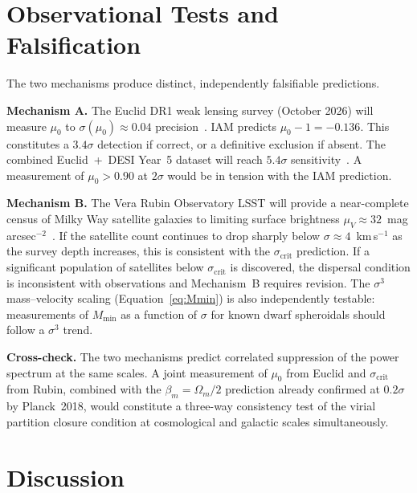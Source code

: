 \documentclass[12pt,a4paper]{article}
\begin{document}
\section{Observational Tests and Falsification}
\label{sec:tests}

The two mechanisms produce distinct, independently falsifiable predictions.

\textbf{Mechanism A.} The Euclid DR1 weak lensing survey (October 2026) will
measure $\mu_0$ to $\sigma(\mu_0) \approx 0.04$ precision~\citep{Euclid2024}.
IAM predicts $\mu_0 - 1 = -0.136$. This constitutes a $3.4\sigma$ detection
if correct, or a definitive exclusion if absent. The combined Euclid~+~DESI
Year~5 dataset will reach $5.4\sigma$ sensitivity~\citep{IAM_survey}. A
measurement of $\mu_0 > 0.90$ at $2\sigma$ would be in tension with the IAM
prediction.

\textbf{Mechanism B.} The Vera Rubin Observatory LSST will provide a
near-complete census of Milky Way satellite galaxies to limiting surface
brightness $\mu_V \approx 32$~mag\,arcsec$^{-2}$~\citep{LSST2009}. If the
satellite count continues to drop sharply below
$\sigma \approx 4$~km\,s$^{-1}$ as the survey depth increases, this is
consistent with the $\sigma_\mathrm{crit}$ prediction. If a significant
population of satellites below $\sigma_\mathrm{crit}$ is discovered, the
dispersal condition is inconsistent with observations and Mechanism~B requires
revision. The $\sigma^3$ mass--velocity scaling (Equation~\ref{eq:Mmin}) is
also independently testable: measurements of $M_\mathrm{min}$ as a function
of $\sigma$ for known dwarf spheroidals should follow a $\sigma^3$ trend.

\textbf{Cross-check.} The two mechanisms predict correlated suppression of
the power spectrum at the same scales. A joint measurement of $\mu_0$ from
Euclid and $\sigma_\mathrm{crit}$ from Rubin, combined with the
$\beta_m = \Omega_m/2$ prediction already confirmed at $0.2\sigma$ by
Planck~2018, would constitute a three-way consistency test of the virial
partition closure condition at cosmological and galactic scales simultaneously.

\section{Discussion}
\label{sec:discussion}
\end{document}
